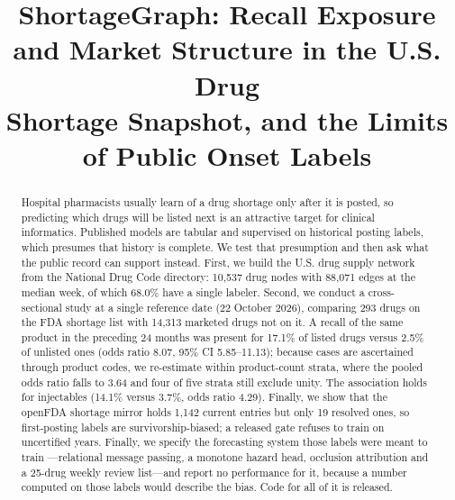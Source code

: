 \documentclass[conference,letterpaper]{IEEEtran}
\newcommand{\ph}[1]{\textcolor{red}{#1}}
\begin{document}
\title{ShortageGraph: Recall Exposure and Market Structure in the U.S. Drug\\
Shortage Snapshot, and the Limits of Public Onset Labels}

\author{
\IEEEauthorblockA{\IEEEauthorrefmark{1}\ph{Department, Institution, City,
State ZIP, USA}\\\ph{email}}
\IEEEauthorblockA{\IEEEauthorrefmark{2}\ph{Department, Institution, City,
State ZIP, USA}\\\ph{email}}}

\maketitle

\begin{abstract}
Hospital pharmacists usually learn of a drug shortage only after it is posted,
so predicting which drugs will be listed next is an attractive target for
clinical informatics. Published models are tabular and supervised on historical
posting labels, which presumes that history is complete. We test that
presumption and then ask what the public record can support instead. First, we
build the U.S. drug supply network from the National Drug Code directory:
10{,}537 drug nodes with 88{,}071 edges at the median week, of which 68.0\% have
a single labeler. Second, we conduct a cross-sectional study at a single
reference date (22 October 2026), comparing 293 drugs on the FDA shortage list
with 14{,}313 marketed drugs not on it. A recall of the same product in the
preceding 24 months was present for 17.1\% of listed drugs versus 2.5\% of
unlisted ones (odds ratio 8.07, 95\% CI 5.85--11.13); because cases are
ascertained through product codes, we re-estimate within product-count strata,
where the pooled odds ratio falls to 3.64 and four of five strata still exclude
unity. The association holds for injectables (14.1\% versus 3.7\%, odds ratio
4.29). Finally, we show that the openFDA shortage mirror holds 1{,}142 current
entries but only 19 resolved ones, so first-posting labels are
survivorship-biased; a released gate refuses to train on uncertified years.
Finally, we specify the forecasting system those labels were meant to train
---relational message passing, a monotone hazard head, occlusion attribution and
a 25-drug weekly review list---and report no performance for it, because a
number computed on those labels would describe the bias. Code for all of it is
released.
\end{abstract}
\end{document}
